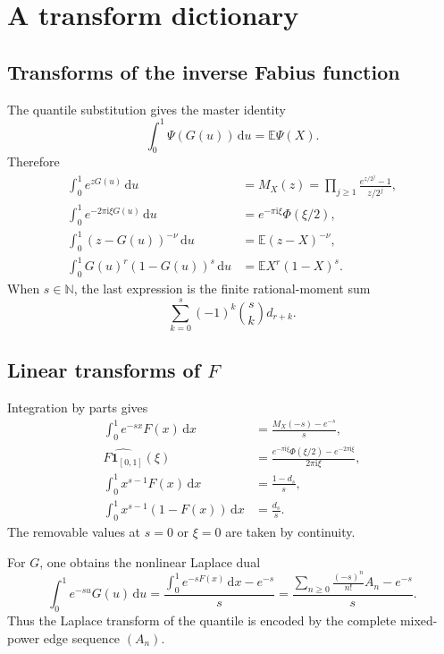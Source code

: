 \documentclass[11pt,oneside]{article}
\theoremstyle{definition}
\theoremstyle{remark}
\newcommand{\F}{F}
\newcommand{\G}{G}
\newcommand{\E}{\mathbb E}
\newcommand{\N}{\mathbb N}
\newcommand{\dd}{\,\mathrm d}
\newcommand{\ii}{\mathrm i}
\begin{document}
\section{A transform dictionary}

\subsection{Transforms of the inverse Fabius function}

The quantile substitution gives the master identity
\begin{equation}\label{eq:quantilepush}
 \int_0^1\Psi(\G(u))\dd u=\E\Psi(X).
\end{equation}
Therefore
\begin{align}
 \int_0^1e^{z\G(u)}\dd u
 &=M_X(z)
 =\prod_{j\ge1}\frac{e^{z/2^j}-1}{z/2^j},\label{eq:Gmgf}\\
 \int_0^1e^{-2\pi\ii\xi\G(u)}\dd u
 &=e^{-\pi\ii\xi}\Phi(\xi/2),\label{eq:Gfourier}\\
 \int_0^1(z-\G(u))^{-\nu}\dd u
 &=\E(z-X)^{-\nu},\label{eq:Gcauchy}\\
 \int_0^1\G(u)^r(1-\G(u))^s\dd u
 &=\E X^r(1-X)^s.\label{eq:Gmixed}
\end{align}
When \(s\in\N\), the last expression is the finite rational-moment sum
\begin{equation}\label{eq:Gmixedfinite}
 \sum_{k=0}^s(-1)^k\binom sk d_{r+k}.
\end{equation}

\subsection{Linear transforms of \(\F\)}

Integration by parts gives
\begin{align}
 \int_0^1e^{-sx}\F(x)\dd x
 &=\frac{M_X(-s)-e^{-s}}s,\label{eq:FLaplace}\\
 \widehat{\F\mathbf1_{[0,1]}}(\xi)
 &=\frac{e^{-\pi\ii\xi}\Phi(\xi/2)-e^{-2\pi\ii\xi}}
 {2\pi\ii\xi},\label{eq:FFourier}\\
 \int_0^1x^{s-1}\F(x)\dd x
 &=\frac{1-d_s}{s},\label{eq:FMellin}\\
 \int_0^1x^{s-1}(1-\F(x))\dd x
 &=\frac{d_s}{s}.\label{eq:survMellin}
\end{align}
The removable values at \(s=0\) or \(\xi=0\) are taken by continuity.

For \(\G\), one obtains the nonlinear Laplace dual
\begin{equation}\label{eq:GLaplace}
 \int_0^1e^{-su}\G(u)\dd u
 =\frac{\displaystyle\int_0^1e^{-s\F(x)}\dd x-e^{-s}}s
 =\frac{\displaystyle\sum_{n\ge0}\frac{(-s)^n}{n!}A_n-e^{-s}}s.
\end{equation}
Thus the Laplace transform of the quantile is encoded by the complete mixed-power
edge sequence \((A_n)\).
\end{document}

